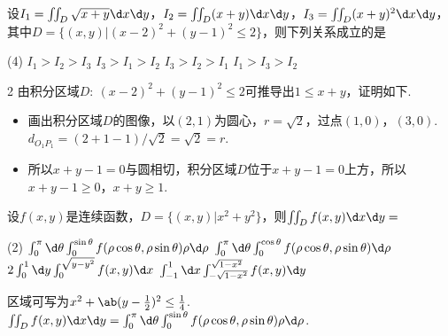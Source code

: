 \begin{problem}
    设$I_1=\iint_D\sqrt{x+y}\d x\d y$，$I_2=\iint_D(x+y)\d x\d y$，$I_3=\iint_D(x+y)^2\d x\d y$，其中$D=\{(x,y)|(x-2)^2+(y-1)^2\leq2\}$，则下列关系成立的是
    \begin{tasks}(4)
        \task $I_1>I_2>I_3$
        \task $I_3>I_1>I_2$
        \task[\true] $I_3>I_2>I_1$
        \task $I_1>I_3>I_2$
    \end{tasks}
\end{problem}
\begin{solution}
\begin{paracol}{2}
    由积分区域$D:\ (x-2)^2+(y-1)^2\leq2$可推导出$1\leq x+y$，证明如下.
    \begin{itemize}
        \item 画出积分区域$D$的图像，以$(2,1)$为圆心，$r=\sqrt2$，过点$(1,0)$，$(3,0)$. $d_{\unit{O_1P_1}}=(2+1-1)/\sqrt2=\sqrt2=r$.
        \item 所以$x+y-1=0$与圆相切，积分区域$D$位于$x+y-1=0$上方，所以$x+y-1\geq0$，$x+y\geq1$.
    \end{itemize}
    \switchcolumn
    \begin{figure}[htbp]
        \centering
    \end{figure}
\end{paracol}
\end{solution}

\begin{problem}
    设$f(x,y)$是连续函数，$D=\{(x,y)|x^2+y^2\}$，则$\iint_Df(x,y)\d x\d y=$
    \begin{tasks}(2)
        \task[\true] $\int_0^\pi\d\theta\int_0^{\sin\theta}f(\rho\cos\theta,\rho\sin\theta)\rho\d\rho$
        \task $\int_0^\pi\d\theta\int_0^{\cos\theta}f(\rho\cos\theta,\rho\sin\theta)\d\rho$
        \task $2\int_0^1\d y\int_0^{\sqrt{y-y^2}}f(x,y)\d x$
        \task $\int_{-1}^1\d x\int_{-\sqrt{1-x^2}}^{\sqrt{1-x^2}}f(x,y)\d y$
    \end{tasks}
\end{problem}
\begin{solution}
    区域可写为$x^2+\ab(y-\frac12)^2\leq\frac14$. $\iint_Df(x,y)\d x\d y=\int_0^\pi\d\theta\int_0^{\sin\theta}f(\rho\cos\theta,\rho\sin\theta)\rho\d\rho$.
\end{solution}

